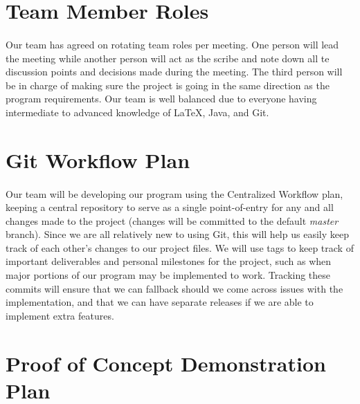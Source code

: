 \documentclass{article}
\begin{document}
\section{Team Member Roles}

\paragraph{}
Our team has agreed on rotating team roles per meeting. One person will lead the meeting while another person will act as the scribe and note down all te discussion points and decisions made during the meeting. The third person will be in charge of making sure the project is going in the same direction as the program requirements. Our team is well balanced due to everyone having intermediate to advanced knowledge of LaTeX, Java, and Git.

\section{Git Workflow Plan}

\paragraph{}
Our team will be developing our program using the Centralized Workflow plan, keeping a central repository to serve as a single point-of-entry for any and all changes made to the project (changes will be committed to the default \textit{master} branch). Since we are all relatively new to using Git, this will help us easily keep track of each other's changes to our project files. We will use tags to keep track of important deliverables and personal milestones for the project, such as when major portions of our program may be implemented to work. Tracking these commits will ensure that we can fallback should we come across issues with the implementation, and that we can have separate releases if we are able to implement extra features.

\section{Proof of Concept Demonstration Plan}
\end{document}
